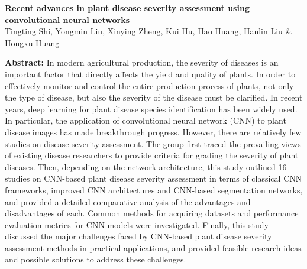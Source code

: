 \renewcommand{\fig}[3]{
	\begin{figure}[!htb]
		\centering
		\texttt{[image: \#1.png]}
		\caption{#3}
		\label{#1-en}
	\end{figure}
}
\renewcommand{\tab}[3]{
	\begin{table}[!htb]
		\centering
		\caption{#3}
		\label{#1-en}
		\texttt{[image: \#1.png]}
	\end{table}
}

\renewcommand{\mySection}[1]{
	\refstepcounter{section}   
	\phantomsection
	\addcontentsline{toc}{section}{\protect\numberline{\thesection} #1}
	\section*{\thesection\quad #1}
}

\begin{center}
    \textbf{Recent advances in plant disease severity assessment using convolutional neural networks}\\    
    \zuozhe Tingting Shi, Yongmin Liu, Xinying Zheng, Kui Hu, Hao Huang, Hanlin Liu \& Hongxu Huang
\end{center}

\tnr
\fontsize{10.5pt}{10.5pt}\selectfont

\noindent\textbf{Abstract: }In modern agricultural production, the severity of diseases is an important factor that directly affects the yield and quality of plants. In order to effectively monitor and control the entire production process of plants, not only the type of disease, but also the severity of the disease must be clarified. In recent years, deep learning for plant disease species identification has been widely used. In particular, the application of convolutional neural network (CNN) to plant disease images has made breakthrough progress. However, there are relatively few studies on disease severity assessment. The group first traced the prevailing views of existing disease researchers to provide criteria for grading the severity of plant diseases. Then, depending on the network architecture, this study outlined 16 studies on CNN-based plant disease severity assessment in terms of classical CNN frameworks, improved CNN architectures and CNN-based segmentation networks, and provided a detailed comparative analysis of the advantages and disadvantages of each. Common methods for acquiring datasets and performance evaluation metrics for CNN models were investigated. Finally, this study discussed the major challenges faced by CNN-based plant disease severity assessment methods in practical applications, and provided feasible research ideas and possible solutions to address these challenges.

